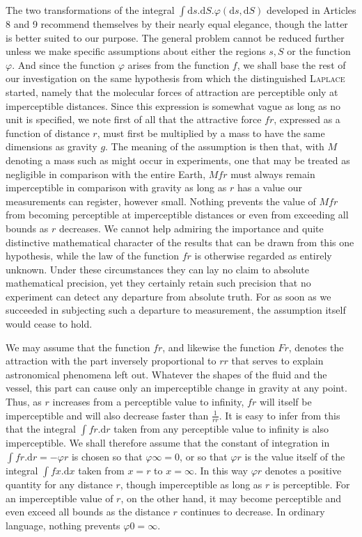 The two transformations of the integral $\int\mathrm{d}s.\mathrm{d}S.\varphi(\mathrm{d}s,\mathrm{d}S)$ developed in Articles 8 and 9 recommend themselves by their nearly equal elegance, though the latter is better suited to our purpose. The general problem cannot be reduced further unless we make specific assumptions about either the regions $s,S$ or the function $\varphi$. And since the function $\varphi$ arises from the function $f$, we shall base the rest of our investigation on the same hypothesis from which the distinguished \textsc{Laplace} started, namely that the molecular forces of attraction are perceptible only at imperceptible distances. Since this expression is somewhat vague as long as no unit is specified, we note first of all that the attractive force $fr$, expressed as a function of distance $r$, must first be multiplied by a mass to have the same dimensions as gravity $g$. The meaning of the assumption is then that, with $M$ denoting a mass such as might occur in experiments, one that may be treated as negligible in comparison with the entire Earth, $Mfr$ must always remain imperceptible in comparison with gravity as long as $r$ has a value our measurements can register, however small. Nothing prevents the value of $Mfr$ from becoming perceptible at imperceptible distances or even from exceeding all bounds as $r$ decreases. We cannot help admiring the importance and quite distinctive mathematical character of the results that can be drawn from this one hypothesis, while the law of the function $fr$ is otherwise regarded as entirely unknown. Under these circumstances they can lay no claim to absolute mathematical precision, yet they certainly retain such precision that no experiment can detect any departure from absolute truth. For as soon as we succeeded in subjecting such a departure to measurement, the assumption itself would cease to hold.

We may assume that the function $fr$, and likewise the function $Fr$, denotes the attraction with the part inversely proportional to $rr$ that serves to explain astronomical phenomena left out. Whatever the shapes of the fluid and the vessel, this part can cause only an imperceptible change in gravity at any point. Thus, as $r$ increases from a perceptible value to infinity, $fr$ will itself be imperceptible and will also decrease faster than $\frac{1}{rr}$. It is easy to infer from this that the integral $\int fr.\mathrm{d}r$ taken from any perceptible value to infinity is also imperceptible. We shall therefore assume that the constant of integration in $\int fr.\mathrm{d}r=-\varphi r$ is chosen so that $\varphi\infty=0$, or so that $\varphi r$ is the value itself of the integral $\int fx.\mathrm{d}x$ taken from $x=r$ to $x=\infty$. In this way $\varphi r$ denotes a positive quantity for any distance $r$, though imperceptible as long as $r$ is perceptible. For an imperceptible value of $r$, on the other hand, it may become perceptible and even exceed all bounds as the distance $r$ continues to decrease. In ordinary language, nothing prevents $\varphi0=\infty$.

